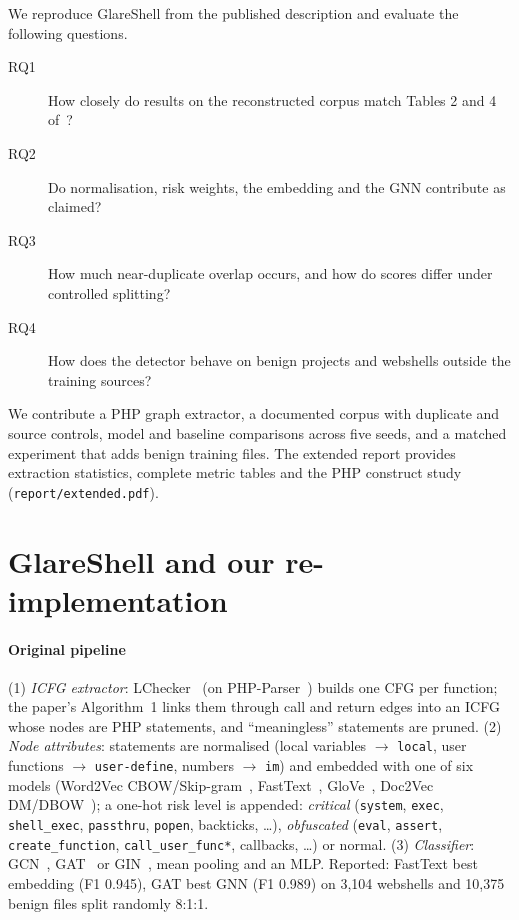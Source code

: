We reproduce GlareShell from the published description and evaluate the following questions.
\begin{description}
  \item[RQ1] How closely do results on the reconstructed corpus match Tables 2 and 4 of~\paperref{}?
  \item[RQ2] Do normalisation, risk weights, the embedding and the GNN contribute as claimed?
  \item[RQ3] How much near-duplicate overlap occurs, and how do scores differ under controlled splitting?
  \item[RQ4] How does the detector behave on benign projects and webshells outside the training sources?
\end{description}
We contribute a PHP graph extractor, a documented corpus with duplicate and source controls, model and
baseline comparisons across five seeds, and a matched experiment that adds benign training files. The extended
report provides extraction statistics, complete metric tables and the PHP construct study
(\texttt{report/extended.pdf}).

\section{GlareShell and our re-implementation}\label{sec:method}
\paragraph{Original pipeline}
(1) \emph{ICFG extractor}: LChecker~\cite{li2021lchecker} (on PHP-Parser~\cite{phpparser}) builds one CFG per function;
the paper's Algorithm~1 links them through call and return edges into an ICFG whose nodes are PHP statements, and
``meaningless'' statements are pruned. (2) \emph{Node attributes}: statements are normalised (local variables $\to$
\texttt{local}, user functions $\to$ \texttt{user-define}, numbers $\to$ \texttt{im}) and embedded with one of six
models (Word2Vec CBOW/Skip-gram~\cite{mikolov2013word2vec}, FastText~\cite{bojanowski2017fasttext},
GloVe~\cite{pennington2014glove}, Doc2Vec DM/DBOW~\cite{le2014doc2vec}); a one-hot risk level is appended:
\emph{critical} (\texttt{system}, \texttt{exec}, \texttt{shell\_exec}, \texttt{passthru}, \texttt{popen}, backticks, \dots),
\emph{obfuscated} (\texttt{eval}, \texttt{assert}, \texttt{create\_function}, \texttt{call\_user\_func*}, callbacks,
\dots) or normal. (3) \emph{Classifier}: GCN~\cite{kipf2017gcn}, GAT~\cite{velickovic2018gat} or GIN~\cite{xu2019gin},
mean pooling and an MLP. Reported: FastText best embedding (F1 0.945), GAT best GNN (F1 0.989) on 3,104 webshells and
10,375 benign files split randomly 8:1:1.

